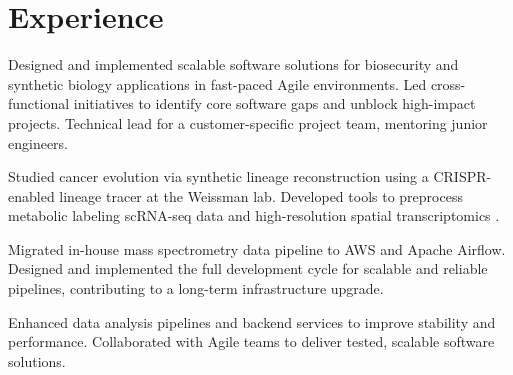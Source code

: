 \documentclass[]{resume}
\begin{document}
\begin{minipage}[t]{0.69\textwidth}


\section{Experience}
Designed and implemented scalable software solutions for biosecurity and synthetic biology applications in fast-paced Agile environments.
Led cross-functional initiatives to identify core software gaps and unblock high-impact projects.
Technical lead for a customer-specific project team, mentoring junior engineers.
\sectionsep

Studied cancer evolution via synthetic lineage reconstruction using a CRISPR-enabled lineage tracer at the Weissman lab. Developed tools to preprocess metabolic labeling scRNA-seq data \cite{dynast} and high-resolution spatial transcriptomics \cite{spateo}.
\sectionsep

Migrated in-house mass spectrometry data pipeline to AWS and Apache Airflow.
Designed and implemented the full development cycle for scalable and reliable pipelines, contributing to a long-term infrastructure upgrade.
\sectionsep


Enhanced data analysis pipelines and backend services to improve stability and performance.
Collaborated with Agile teams to deliver tested, scalable software solutions.
\sectionsep


\end{minipage}
\end{document}
